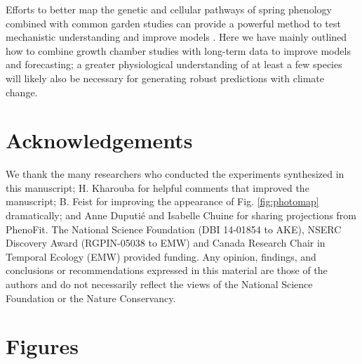 \documentclass{article}
\begin{document}
\par Efforts to better map the genetic and cellular pathways of spring phenology combined with common garden studies can provide a powerful method to test mechanistic understanding and improve models \citep[e.g.,][]{Burghardt2015,fournier2016}. Here we have mainly outlined how to combine growth chamber studies with long-term data to improve models and forecasting; a greater physiological understanding of at least a few species will likely also be necessary for generating robust predictions with climate change.

\section*{Acknowledgements}
We thank the many researchers who conducted the experiments synthesized in this manuscript; H. Kharouba for helpful comments that improved the manuscript; B. Feist for improving the appearance of Fig. \ref{fig:photomap} dramatically; and Anne Duputi\'e and Isabelle Chuine for sharing projections from PhenoFit. The National Science Foundation (DBI 14-01854 to AKE), NSERC Discovery Award (RGPIN-05038 to EMW) and Canada Research Chair in Temporal Ecology (EMW) provided funding. Any opinion, findings, and conclusions or recommendations expressed in this material are those of the authors and do not necessarily reflect the views of the National Science Foundation or the Nature Conservancy.

\clearpage


\section* {Figures}
\end{document}
